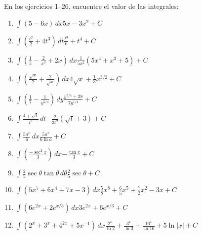 {}
\begin{ejer}{En los ejercicios 1–26, encuentre el valor de las integrales:}




\begin{enumerate}

\item {$\int (5-6x)\,dx$}{$5x - 3x^{2} + C$}

\item {$\int \left( \frac{t^{2}}{2} + 4t^{3} \right)\,dt$}{$\frac{t^{3}}{6} + t^{4} + C$}

\item {$\int \left( \frac{1}{5} - \frac{2}{x^{3}} + 2x \right)\,dx$}{$\frac{1}{5x^{2}}(5x^{4} + x^{3} + 5) + C$}

\item {$\int \left( \frac{\sqrt{x}}{2} + \frac{2}{\sqrt{x}} \right)\,dx$}{$4\sqrt{x} + \frac{1}{3}x^{3/2} + C$}

\item {$\int \left( \frac{1}{7} - \frac{1}{y^{5/4}} \right)\,dy$}{$\frac{y^{5/4} + 28}{7y^{1/4}} + C$}

\item {$\int \frac{4 + \sqrt{t}}{t^{3}}\,dt$}{$-\frac{2}{3t^{2}}(\sqrt{t} + 3) + C$}

\item {$\int \frac{5a^{x}}{6}\,dx$}{$\frac{5a^{x}}{6\ln a} + C$}

\item {$\int \left( \frac{-\sec^{2}x}{3} \right)\,dx$}{$-\frac{\tan x}{3} + C$}

\item {$\int \frac{2}{5}\sec \theta \tan \theta\,d\theta$}{$\frac{2}{5}\sec \theta + C$}

\item {$\int \left( 5x^{7} + 6x^{4} + 7x - 3 \right)\,dx$}{$\frac{5}{8}x^{8} + \frac{6}{5}x^{5} + \frac{7}{2}x^{2} - 3x + C$}

\item {$\int \left( 6e^{2x} + 2e^{x/3} \right)\,dx$}{$3e^{2x} + 6e^{x/3} + C$}

\item {$\int \left( 2^{x} + 3^{x} + 4^{2x} + 5x^{-1} \right)\,dx$}{$\frac{2^{x}}{\ln 2} + \frac{3^{x}}{\ln 3} + \frac{16^{x}}{\ln 16} + 5\ln |x| + C$}


\end{enumerate}
\end{ejer}
